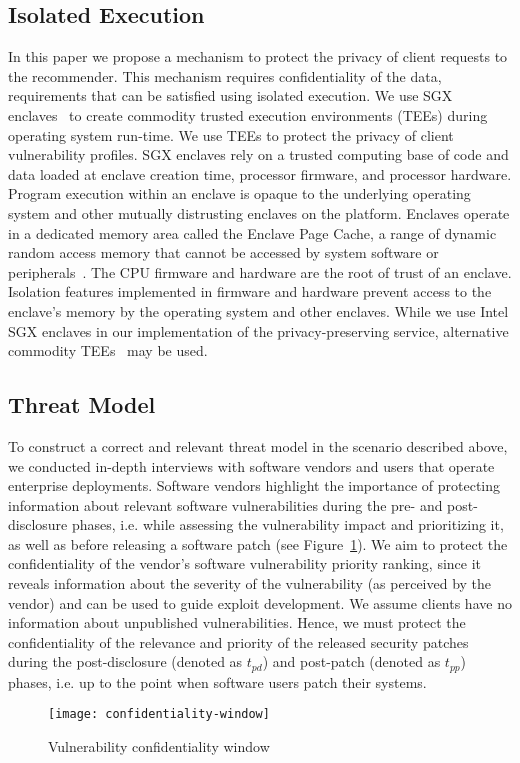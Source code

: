 {\subsection{Isolated Execution}
\label{subsec:isolatedexecution}
In this paper we propose a mechanism to protect the privacy of client requests to the recommender.
This mechanism requires confidentiality of the data, requirements that can be satisfied using isolated execution. 
We use SGX enclaves~\cite{anati:2013,mckeen:2013,xing:2016,mckeen:2016} to create commodity trusted execution environments (TEEs) during operating system run-time.
We use TEEs to protect the privacy of client vulnerability profiles.
SGX enclaves rely on a trusted computing base of code and data loaded at enclave creation time, processor firmware, and processor hardware.
Program execution within an enclave is opaque to the underlying operating system and other mutually distrusting enclaves on the platform.
Enclaves operate in a dedicated memory area called the Enclave Page Cache, a range of dynamic random access memory that cannot be accessed by system software or peripherals~\cite{mckeen:2013}.
The CPU firmware and hardware are the root of trust of an enclave.
Isolation features implemented in firmware and hardware prevent access to the enclave's memory by the operating system and other enclaves.
While we use Intel SGX enclaves in our implementation of the privacy-preserving service, alternative commodity TEEs~\cite{mofrad:2017, brasser:2019} may be used.

\subsection{Threat Model}
\label{subsec:threat-model}

To construct a correct and relevant threat model in the scenario described above, we conducted in-depth interviews with software vendors and users that operate enterprise deployments.
Software vendors highlight the importance of protecting information about relevant software vulnerabilities during the pre- and post-disclosure phases, i.e. while assessing the vulnerability impact and prioritizing it, as well as before releasing a software patch (see Figure~\ref{fig:conf-window}).
We aim to protect the confidentiality of the vendor's software vulnerability priority ranking, since it reveals information about the severity of the vulnerability (as perceived by the vendor) and can be used to guide exploit development.
We assume clients have no information about unpublished vulnerabilities.
Hence, we must protect the confidentiality of the relevance and priority of the released security patches during the post-disclosure (denoted as $t_{pd}$) and post-patch (denoted as $t_{pp}$) phases, i.e. up to the point when software users patch their systems.
\begin{figure}[h]
  \centering
  \texttt{[image: confidentiality-window]}
  \caption{Vulnerability confidentiality window}
  \label{fig:conf-window}
\end{figure}

}

